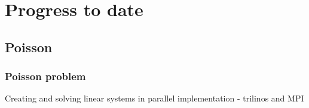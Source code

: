 \documentclass{beamer}
\begin{document}
\section[Progress]{Progress to date}

\subsection{Poisson}
\begin{frame}[shrink=20]%
\frametitle{Poisson problem}
\scriptsize
\begin{minipage}[t][1\textheight]{1\textwidth}
\vspace{-20pt}
\begin{exampleblock}{Creating and solving linear systems in parallel implementation - trilinos and MPI}
\vspace{-20pt}
\begin{figure}
\label{fig:Poisson}
\centering
{}

\end{figure}
\end{exampleblock}
\end{minipage}
\end{frame}
\end{document}
